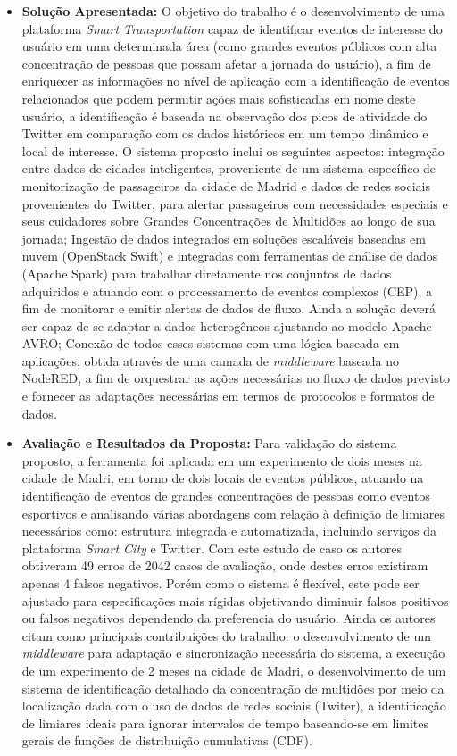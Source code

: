 \documentclass[tid,table]{texufpel} %
\begin{document}
\begin{itemize}
	\item \textbf{Solução Apresentada:} O objetivo do trabalho é o desenvolvimento de uma plataforma \textit{Smart Transportation} capaz de identificar eventos de interesse do usuário em uma determinada área (como grandes eventos públicos com alta concentração de pessoas que possam afetar a jornada do usuário), a fim de enriquecer as informações no nível de aplicação com a identificação de eventos relacionados que podem permitir ações mais sofisticadas em nome deste usuário, a identificação é baseada na observação dos picos de atividade do Twitter em comparação com os dados históricos em um tempo dinâmico e local de interesse. O sistema proposto inclui os seguintes aspectos: integração entre dados de cidades inteligentes, proveniente de um sistema específico de monitorização de passageiros da cidade de Madrid e dados de redes sociais provenientes do Twitter, para alertar passageiros com necessidades especiais e seus cuidadores sobre Grandes Concentrações de Multidões ao longo de sua jornada; Ingestão de dados integrados em soluções escaláveis baseadas em nuvem (OpenStack Swift) e integradas com ferramentas de análise de dados (Apache Spark) para trabalhar diretamente nos conjuntos de dados adquiridos e atuando com o processamento de eventos complexos (CEP), a fim de monitorar e emitir alertas de dados de fluxo. Ainda a solução deverá ser capaz de se adaptar a dados heterogêneos ajustando ao modelo Apache AVRO; Conexão de todos esses sistemas com uma lógica baseada em aplicações, obtida através de uma camada de \textit{middleware} baseada no NodeRED, a fim de orquestrar as ações necessárias no fluxo de dados previsto e fornecer as adaptações necessárias em termos de protocolos e formatos de dados.	
	
	\item \textbf{Avaliação e Resultados da Proposta:} Para validação do sistema proposto, a ferramenta foi aplicada em um experimento de dois meses na cidade de Madri, em torno de dois locais de eventos públicos, atuando na identificação de eventos de grandes concentrações de pessoas como eventos esportivos e analisando várias abordagens com relação à definição de limiares necessários como: estrutura integrada e automatizada, incluindo serviços da plataforma \textit{Smart City} e Twitter. Com este estudo de caso os autores obtiveram 49 erros de 2042 casos de avaliação, onde destes erros existiram apenas 4 falsos negativos. Porém como o sistema é flexível, este pode ser ajustado para especificações mais rígidas objetivando diminuir falsos positivos ou falsos negativos dependendo da preferencia do usuário.
	Ainda os autores citam como principais contribuições do trabalho: o desenvolvimento de um \textit{middleware} para adaptação e sincronização necessária do sistema, a execução de um experimento de 2 meses na cidade de Madri, o desenvolvimento de um sistema de identificação detalhado da concentração  de multidões por meio da localização dada com o uso de dados de redes sociais (Twiter), a identificação de limiares ideais para ignorar intervalos de tempo baseando-se em limites gerais de funções de distribuição cumulativas (CDF).
\end{itemize}
\end{document}
